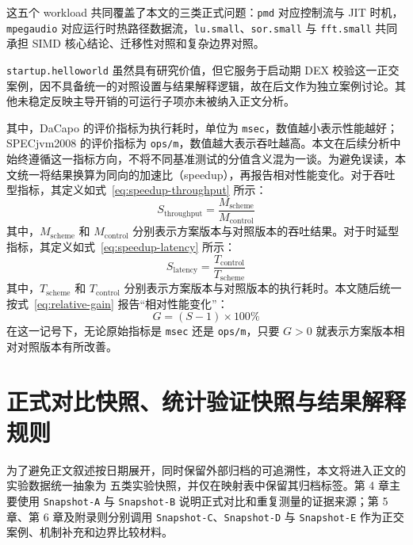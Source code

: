 这五个 workload 共同覆盖了本文的三类正式问题：\texttt{pmd} 对应控制流与 JIT 时机，
\texttt{mpegaudio} 对应运行时热路径数据流，\texttt{lu.small}、\texttt{sor.small} 与
\texttt{fft.small} 共同承担 SIMD 核心结论、迁移性对照和复杂边界对照。

\texttt{startup.\allowbreak helloworld} 虽然具有研究价值，但它服务于启动期 DEX 校验这一正交案例，因不具备统一的对照设置与结果解释逻辑，故在后文作为独立案例讨论。其他未稳定反映主导开销的可运行子项亦未被纳入正文分析。

其中，DaCapo 的评价指标为执行耗时，单位为 \texttt{msec}，数值越小表示性能越好；SPECjvm2008 的评价指标为 \texttt{ops/m}，数值越大表示吞吐越高。本文在后续分析中始终遵循这一指标方向，不将不同基准测试的分值含义混为一谈。为避免误读，本文统一将结果换算为同向的加速比（speedup），再报告相对性能变化。对于吞吐型指标，其定义如式~\ref{eq:speedup-throughput} 所示：
\begin{equation}
    \label{eq:speedup-throughput}
    S_{\text{throughput}} = \frac{M_{\text{scheme}}}{M_{\text{control}}}
\end{equation}
其中，$M_{\text{scheme}}$ 和 $M_{\text{control}}$ 分别表示方案版本与对照版本的吞吐结果。对于时延型指标，其定义如式~\ref{eq:speedup-latency} 所示：
\begin{equation}
    \label{eq:speedup-latency}
    S_{\text{latency}} = \frac{T_{\text{control}}}{T_{\text{scheme}}}
\end{equation}
其中，$T_{\text{scheme}}$ 和 $T_{\text{control}}$ 分别表示方案版本与对照版本的执行耗时。本文随后统一按式~\ref{eq:relative-gain} 报告“相对性能变化”：
\begin{equation}
    \label{eq:relative-gain}
    G = (S - 1)\times 100\%
\end{equation}
在这一记号下，无论原始指标是 \texttt{msec} 还是 \texttt{ops/m}，只要 $G>0$ 就表示方案版本相对对照版本有所改善。

\section{正式对比快照、统计验证快照与结果解释规则}

为了避免正文叙述按日期展开，同时保留外部归档的可追溯性，本文将进入正文的实验数据统一抽象为
五类实验快照，并仅在映射表中保留其归档标签。第 4 章主要使用 \texttt{Snapshot-A} 与
\texttt{Snapshot-B} 说明正式对比和重复测量的证据来源；第 5 章、第 6 章及附录则分别调用
\texttt{Snapshot-C}、\texttt{Snapshot-D} 与 \texttt{Snapshot-E} 作为正交案例、机制补充和边界比较材料。


